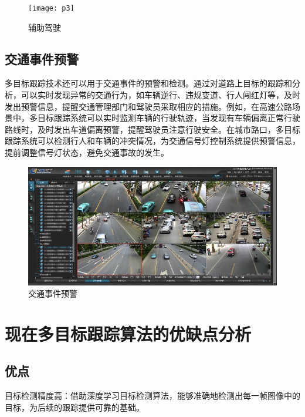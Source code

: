 \begin{figure}[htbp] %
	\centering
	\texttt{[image: p3]} %
	\caption{辅助驾驶} %
	\label{fig:p3} %
\end{figure}



\subsection{交通事件预警}
多目标跟踪技术还可以用于交通事件的预警和检测。通过对道路上目标的跟踪和分析，可以实时发现异常的交通行为，如车辆逆行、违规变道、行人闯红灯等，及时发出预警信息，提醒交通管理部门和驾驶员采取相应的措施。例如，在高速公路场景中，多目标跟踪系统可以实时监测车辆的行驶轨迹，当发现有车辆偏离正常行驶路线时，及时发出车道偏离预警，提醒驾驶员注意行驶安全。在城市路口，多目标跟踪系统可以检测行人和车辆的冲突情况，为交通信号灯控制系统提供预警信息，提前调整信号灯状态，避免交通事故的发生\cite{zhang2021survey}。




\begin{figure}[htbp] %
	\centering
	\includegraphics[width=1\textwidth]{p4} %
	\caption{交通事件预警} %
	\label{fig:p4} %
\end{figure}




\section{现在多目标跟踪算法的优缺点分析}

\subsection{优点}
目标检测精度高：借助深度学习目标检测算法，能够准确地检测出每一帧图像中的目标，为后续的跟踪提供可靠的基础。

